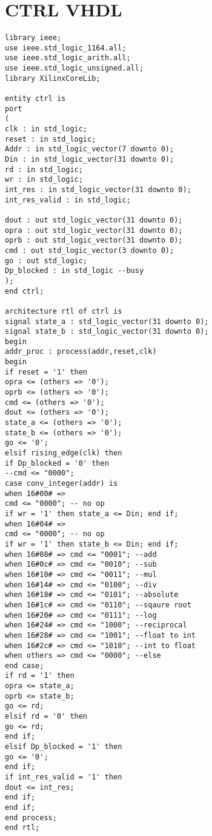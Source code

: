 \documentclass[conference]{IEEEtran}
\begin{document}
\section{CTRL VHDL}
	\begin{lstlisting}	
library ieee;
use ieee.std_logic_1164.all;
use ieee.std_logic_arith.all;
use ieee.std_logic_unsigned.all;
library XilinxCoreLib;

entity ctrl is
port
(
clk : in std_logic;
reset : in std_logic;
Addr : in std_logic_vector(7 downto 0);
Din : in std_logic_vector(31 downto 0);
rd : in std_logic;
wr : in std_logic;
int_res : in std_logic_vector(31 downto 0);
int_res_valid : in std_logic;

dout : out std_logic_vector(31 downto 0);
opra : out std_logic_vector(31 downto 0);
oprb : out std_logic_vector(31 downto 0);
cmd : out std_logic_vector(3 downto 0);
go : out std_logic;
Dp_blocked : in std_logic --busy
);
end ctrl;

architecture rtl of ctrl is
signal state_a : std_logic_vector(31 downto 0);
signal state_b : std_logic_vector(31 downto 0);
begin	
addr_proc : process(addr,reset,clk)
begin
if reset = '1' then 
opra <= (others => '0');	
oprb <= (others => '0');
cmd <= (others => '0');
dout <= (others => '0');
state_a <= (others => '0');
state_b <= (others => '0');
go <= '0';
elsif rising_edge(clk) then
if Dp_blocked = '0' then
--cmd <= "0000";
case conv_integer(addr) is
when 16#00# =>
cmd <= "0000"; -- no op
if wr = '1' then state_a <= Din; end if;
when 16#04# => 
cmd <= "0000"; -- no op
if wr = '1' then state_b <= Din; end if;
when 16#08# => cmd <= "0001"; --add
when 16#0c# => cmd <= "0010"; --sub
when 16#10# => cmd <= "0011"; --mul
when 16#14# => cmd <= "0100"; --div
when 16#18# => cmd <= "0101"; --absolute
when 16#1c# => cmd <= "0110"; --sqaure root
when 16#20# => cmd <= "0111"; --log
when 16#24# => cmd <= "1000"; --reciprocal
when 16#28# => cmd <= "1001"; --float to int
when 16#2c# => cmd <= "1010"; --int to float
when others => cmd <= "0000"; --else
end case;
if rd = '1' then
opra <= state_a;
oprb <= state_b;
go <= rd;
elsif rd = '0' then
go <= rd;
end if;
elsif Dp_blocked = '1' then
go <= '0';
end if;
if int_res_valid = '1' then
dout <= int_res;
end if;
end if;
end process;
end rtl;

	\end{lstlisting}
\end{document}
